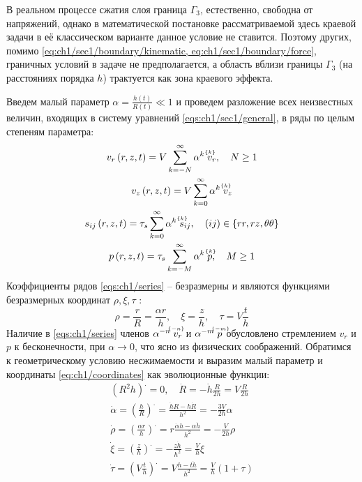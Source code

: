 В реальном процессе сжатия слоя граница $\Gamma_{3}$, естественно, свободна от напряжений, однако в математической постановке рассматриваемой здесь краевой задачи в её классическом варианте данное условие не ставится. Поэтому других, помимо \cref{eq:ch1/sec1/boundary/kinematic, eq:ch1/sec1/boundary/force}, граничных условий в задаче не предполагается, а область вблизи границы $\Gamma_{3}$ (на расстояниях порядка $h$) трактуется как зона краевого эффекта.

Введем малый параметр $\alpha = \frac{h(t)}{R(t)} \ll 1$ и проведем разложение всех неизвестных величин, входящих в систему уравнений \cref{eqs:ch1/sec1/general}, в ряды по целым степеням параметра:
\begin{subequations}
  \label{eqs:ch1/series}
  \begin{gather}
    v_{r}\left(r, z, t\right) = V \sum_{k=-N}^{\infty}{\alpha^{k} \; \uindex{v}{k}_{r}}, \quad N \ge 1
    \\
    v_{z}\left(r, z, t\right) = V \sum_{k=0}^{\infty}{\alpha^{k} \; \uindex{v}{k}_{z}}
    \\
    s_{ij}\left(r, z, t\right) = \tau_{s} \sum_{k=0}^{\infty}{\alpha^{k} \; \uindex{s}{k}_{ij}}, \quad (ij)\in\{rr, rz, \theta\theta\}
    \\
    p\left(r, z, t \right) = \tau_{s} \sum_{k=-M}^{\infty}{\alpha^{k} \; \uindex{p}{k}}, \quad M \ge 1
  \end{gather}
\end{subequations}
Коэффициенты рядов \cref{eqs:ch1/series} -- безразмерны и являются функциями безразмерных координат $\rho, \xi, \tau$ :
\begin{equation}
  \label{eq:ch1/coordinates}
  \rho = \frac{r}{R} = \frac{\alpha r}{h}, \quad \xi = \frac{z}{h}, \quad \tau = V \frac{t}{h}
\end{equation}
Наличие в \cref{eqs:ch1/series} членов $\alpha^{-n} \; \uindex{v}{-n}_{r}$ и $\alpha^{-m} \; \uindex{p}{-m}$ обусловлено стремлением $v_{r}$ и $p$ к бесконечности, при $\alpha\rightarrow 0$, что ясно из физических соображений.
Обратимся к геометрическому условию несжимаемости и выразим малый параметр и координаты \cref{eq:ch1/coordinates} как эволюционные функции:
\begin{subequations}
  \begin{gather}
    \left(R^2 h\right)^. = 0, \quad \dot{R} = -\dot{h} \frac{R}{2h}= V \frac{R}{2h}\nonumber
    \\
    \dot{\alpha} = \left(\frac{h}{R}\right)^. = \frac{\dot{h}R - h\dot{R}}{h^2} = -\frac{3 V}{2 h} \alpha
    \\
    \dot{\rho} = \left(\frac{\alpha r}{h}\right)^. = r \frac{\dot{\alpha} h - \alpha \dot{h}}{h^2} = -\frac{V}{2h}\rho
    \\
    \dot{\xi} = \left(\frac{z}{h}\right)^. = -\frac{z \dot{h}}{h^2} = \frac{V}{h}\xi
    \\
    \dot{\tau} = \left(V \frac{t}{h}\right)^. = V \frac{h - t\dot{h}}{h^2} = \frac{V}{h} \left(1+\tau\right)
  \end{gather}
\end{subequations}
